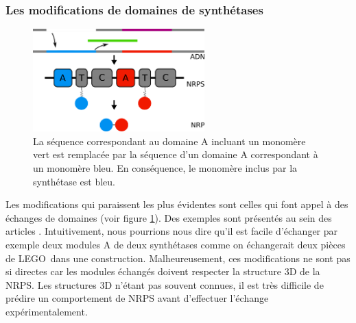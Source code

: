 \subsubsection{Les modifications de domaines de synthétases}

\begin{figure}[h!]
  \begin{center}
    \includegraphics[width=250px]{Figures/synthese/echange.png}
    \caption{\label{echange}La séquence correspondant au domaine A incluant un monomère vert est remplacée par la séquence d'un domaine A correspondant à un monomère bleu.
    En conséquence, le monomère inclus par la synthétase est bleu.}
  \end{center}
\end{figure}

Les modifications qui paraissent les plus évidentes sont celles qui font appel à des échanges de domaines (voir figure \ref{echange}).
Des exemples sont présentés au sein des articles \cite{cane_harnessing_1998,kim_reinvigorating_2015}.
Intuitivement, nous pourrions nous dire qu'il est facile d'échanger par exemple deux modules A de deux synthétases comme on échangerait deux pièces de LEGO\textregistered ~dans une construction.
Malheureusement, ces modifications ne sont pas si directes car les modules échangés doivent respecter la structure 3D de la NRPS.
Les structures 3D n'étant pas souvent connues, il est très difficile de prédire un comportement de NRPS avant d'effectuer l'échange expérimentalement.


